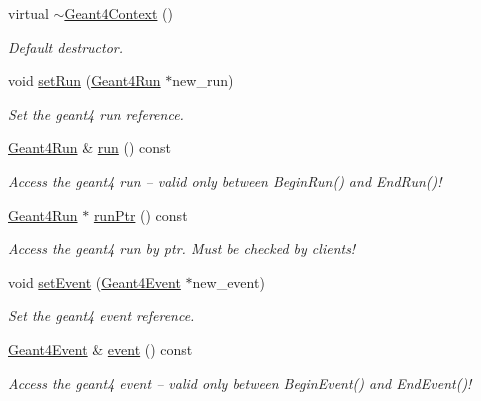 \begin{DoxyCompactItemize}
\item 
virtual \hyperlink{class_d_d4hep_1_1_simulation_1_1_geant4_context_a2749e0729fa01575c3bac14918cca3c8}{$\sim$\+Geant4\+Context} ()
\begin{DoxyCompactList}\small\item\em Default destructor. \end{DoxyCompactList}\item 
void \hyperlink{class_d_d4hep_1_1_simulation_1_1_geant4_context_a31bdc70c285a758ad7563d5c54a5072a}{set\+Run} (\hyperlink{class_d_d4hep_1_1_simulation_1_1_geant4_run}{Geant4\+Run} $\ast$new\+\_\+run)
\begin{DoxyCompactList}\small\item\em Set the geant4 run reference. \end{DoxyCompactList}\item 
\hyperlink{class_d_d4hep_1_1_simulation_1_1_geant4_run}{Geant4\+Run} \& \hyperlink{class_d_d4hep_1_1_simulation_1_1_geant4_context_a4d61ebf8b11ae03c9693a4c813475b5c}{run} () const
\begin{DoxyCompactList}\small\item\em Access the geant4 run -- valid only between Begin\+Run() and End\+Run()! \end{DoxyCompactList}\item 
\hyperlink{class_d_d4hep_1_1_simulation_1_1_geant4_run}{Geant4\+Run} $\ast$ \hyperlink{class_d_d4hep_1_1_simulation_1_1_geant4_context_afa68af67dfcc2bcdb1de8fb345254e07}{run\+Ptr} () const
\begin{DoxyCompactList}\small\item\em Access the geant4 run by ptr. Must be checked by clients! \end{DoxyCompactList}\item 
void \hyperlink{class_d_d4hep_1_1_simulation_1_1_geant4_context_aa0bb03714fc9c82ed1d07ca804b73553}{set\+Event} (\hyperlink{class_d_d4hep_1_1_simulation_1_1_geant4_event}{Geant4\+Event} $\ast$new\+\_\+event)
\begin{DoxyCompactList}\small\item\em Set the geant4 event reference. \end{DoxyCompactList}\item 
\hyperlink{class_d_d4hep_1_1_simulation_1_1_geant4_event}{Geant4\+Event} \& \hyperlink{class_d_d4hep_1_1_simulation_1_1_geant4_context_a47f2c31d7ddd7a9890c6a58e19a32b99}{event} () const
\begin{DoxyCompactList}\small\item\em Access the geant4 event -- valid only between Begin\+Event() and End\+Event()! \end{DoxyCompactList}\item 

\end{DoxyCompactItemize}
